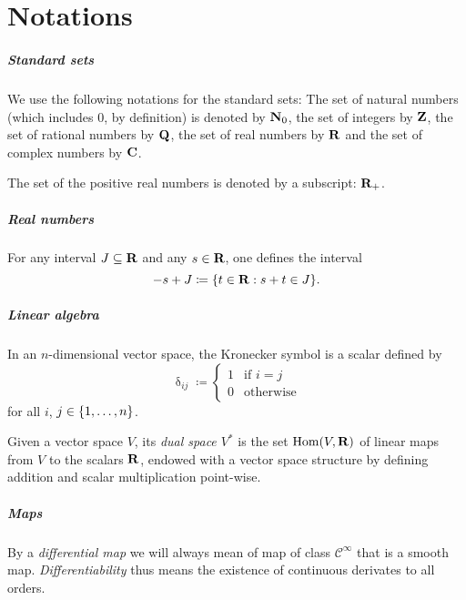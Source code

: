 \chapter*{Notations}

\paragraph{Standard sets}
We use the following notations for the standard sets: The set of natural
numbers (which includes $0$, by definition) is denoted by $\mathbf{N}_0$, the set
of integers by $\mathbf{Z}$, the set of rational numbers by $\mathbf{Q}$, the set of
real numbers by $\mathbf{R}$ and the set of complex numbers by $\mathbf{C}$.

The set of the positive real numbers is denoted by a subscript: $\mathbf{R}_+$. 

\paragraph{Real numbers}

For any interval $J \subseteq \mathbf{R}$ and any $s \in \mathbf{R}$, one defines the interval
\[
  - s + J \coloneqq \lbrace t \in \mathbf{R} : s + t \in J\rbrace.
\]

\paragraph{Linear algebra}

In an $n$-dimensional vector space, the Kronecker symbol is a scalar defined by 
\[
  \updelta_{ij} \coloneqq \begin{cases}
    1 & \text{if $i = j$} \\
    0 & \text{otherwise}
  \end{cases}
\]
for all $i$, $j \in \lbrace1, \dotsc, n\rbrace$.

Given a vector space $V$, its \emph{dual space $V^*$} is the set $\operatorname{Hom}(V, \mathbf{R})$
of linear maps from $V$ to the scalars $\mathbf{R}$, endowed with a vector space
structure by defining addition and scalar multiplication point-wise.

\paragraph{Maps}

By a \emph{differential map} we will always mean of map of class $\mathcal C^\infty$
that is a smooth map. \emph{Differentiability} thus means the existence of
continuous derivates to all orders.

